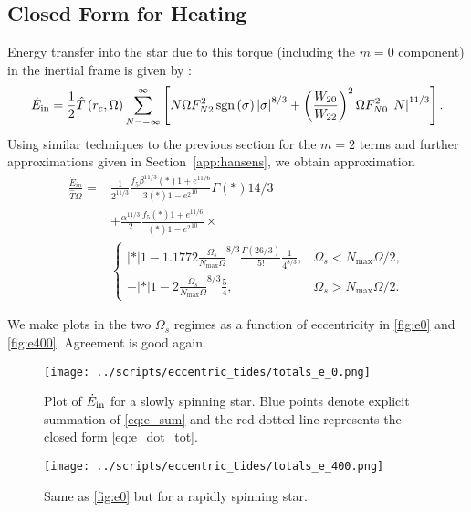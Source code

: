 \documentclass[
        fleqn,
        usenatbib,
        referee,
    ]{mnras}
\newcommand*{\abs}[1]{\left|#1\right|}
\newcommand*{\p}[1]{\left(#1\right)}
\newcommand*{\s}[1]{\left[#1\right]}
\DeclareMathOperator*{\sgn}{sgn}
\begin{document}
\subsection{Closed Form for Heating}

Energy transfer into the star due to this torque (including the $m = 0$
component) in the inertial frame is given by \citealt{vlf}:
\begin{align}
     \dot{E}_{\rm in} = \frac{1}{2}\hat{T}\p{r_c, \Omega}
         \sum\limits_{N = -\infty}^\infty\s{
            N\Omega F_{N2}^2 \sgn \p{\sigma} \abs{\sigma}^{8/3}
            + \p{\frac{W_{20}}{W_{22}}}^2\Omega F_{N0}^2 \abs{N}^{11/3}}.
            \label{eq:e_sum}
\end{align}
Using similar techniques to the previous section for the $m=2$ terms and further
approximations given in Section~\ref{app:hansens}, we obtain approximation
\begin{align}
    \frac{\dot{E}_{in}}{\hat{T}\Omega} ={}&
            \frac{1}{2^{11/3}}
            \frac{f_5 \beta^{11/3}\p*{1 + e}^{11/6}}{3\p*{1 - e^2}^{10}}
            \Gamma\p*{14/3}\nonumber\\
        & + \frac{\alpha^{11/3}}{2}
                \frac{f_5\p*{1 + e}^{11/6}}{\p*{1 - e^2}^{10}}
                \times\nonumber\\
        &\begin{cases}
            \abs*{1 - 1.1772\frac{\Omega_s}{N_{\max}\Omega}}^{8/3}
                \frac{\Gamma(26/3)}{5!}\frac{1}{4^{8/3}},
                & \Omega_s < N_{\max}\Omega/2,\\[5pt]
            -\abs*{1 - 2\frac{\Omega_s}{N_{\max}\Omega}}^{8/3}\frac{5}{4},
                & \Omega_s > N_{\max}\Omega/2.
        \end{cases}\label{eq:total_heating}
\end{align}

We make plots in the two $\Omega_s$ regimes as a function of eccentricity in
\autoref{fig:e0} and \autoref{fig:e400}. Agreement is good again.
\begin{figure}
    \centering
    \texttt{[image: ../scripts/eccentric\_tides/totals\_e\_0.png]}
    \caption{Plot of $\dot{E}_{\rm in}$ for a slowly spinning star. Blue points
    denote explicit summation of \autoref{eq:e_sum} and the red dotted line
    represents the closed form \autoref{eq:e_dot_tot}.}\label{fig:e0}
\end{figure}
\begin{figure}
    \centering
    \texttt{[image: ../scripts/eccentric\_tides/totals\_e\_400.png]}
    \caption{Same as \autoref{fig:e0} but for a rapidly spinning
    star.}\label{fig:e400}
\end{figure}
\end{document}
